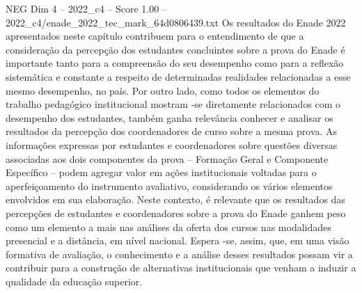 \begin{textsample}{NEG Dim 4 – 2022\_c4 – Score 1.00 – 2022\_c4/enade\_2022\_tec\_mark\_64d0806439.txt}
Os resultados do Enade 2022 apresentados neste capítulo contribuem para o entendimento de que a consideração da percepção dos estudantes concluintes sobre a prova do Enade é importante tanto para a compreensão do seu desempenho como para a reflexão sistemática e constante a respeito de determinadas realidades relacionadas a esse mesmo desempenho, no país.
Por outro lado, como todos os elementos do trabalho pedagógico institucional mostram -se diretamente relacionados com o desempenho dos estudantes, também ganha relevância conhecer e analisar os resultados da percepção dos coordenadores de curso sobre a mesma prova.
As informações expressas por estudantes e coordenadores sobre questões diversas associadas aos dois componentes da prova – Formação Geral e Componente Específico – podem agregar valor em ações institucionais voltadas para o aperfeiçoamento do instrumento avaliativo, considerando os vários elementos envolvidos em sua elaboração.
Neste contexto, é relevante que os resultados das percepções de estudantes e coordenadores sobre a prova do Enade ganhem peso como um elemento a mais nas análises da oferta dos cursos nas modalidades presencial e a distância, em nível nacional.
Espera -se, assim, que, em uma visão formativa de avaliação, o conhecimento e a análise desses resultados possam vir a contribuir para a construção de alternativas institucionais que venham a induzir a qualidade da educação superior.

\end{textsample}

